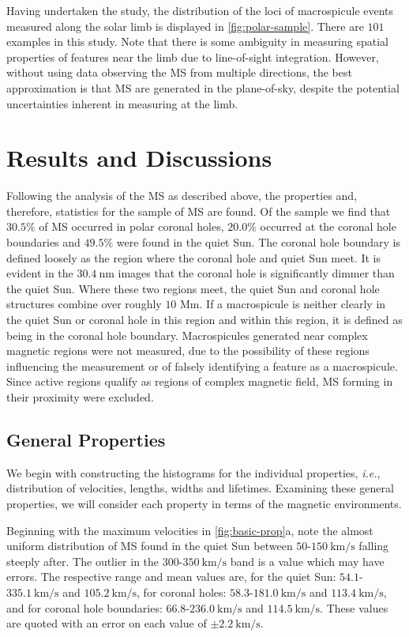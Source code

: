 Having undertaken the study, the distribution of the loci of macrospicule events measured along the solar limb is displayed in \cref{fig:polar-sample}. There are $101$ examples in this study. Note that there is some ambiguity in measuring spatial properties of features near the limb due to line-of-sight integration. However, without using data observing the MS from multiple directions, the best approximation is that MS are generated in the plane-of-sky, despite the potential uncertainties inherent in measuring at the limb.



\section{Results and Discussions}
\label{sec:RandD1}
Following the analysis of the MS as described above, the properties and, therefore, statistics for the sample of MS are found.
Of the sample we find that $30.5 \%$ of MS occurred in polar coronal holes, $20.0 \%$ occurred at the coronal hole boundaries and $49.5 \%$ were found in the quiet Sun.
The coronal hole boundary is defined loosely as the region where the coronal hole and quiet Sun meet. It is evident in the $30.4\ \textrm{nm}$ images that the coronal hole is significantly dimmer than the quiet Sun. 
Where these two regions meet, the quiet Sun and coronal hole structures combine over roughly $10$ Mm.
If a macrospicule is neither clearly in the quiet Sun or coronal hole in this region and within this region, it is defined as being in the coronal hole boundary.
Macrospicules generated near complex magnetic regions were not measured, due to the possibility of these regions influencing the measurement or of falsely identifying a feature as a macrospicule. Since active regions qualify as regions of complex magnetic field, MS forming in their proximity were excluded.


\subsection{General Properties}
We begin with constructing the histograms for the individual properties, \emph{i.e.}, distribution of velocities, lengths, widths and lifetimes. Examining these general properties, we will consider each property in terms of the magnetic environments.

Beginning with the maximum velocities in \cref{fig:basic-prop}a, note the almost uniform distribution of MS found in the quiet Sun between $50$-$150\ \textrm{km/s}$ falling steeply after. The outlier in the $300$-$350\ \textrm{km/s}$ band is a value which may have errors. The respective range and mean values are, for the quiet Sun: $54.1$-$335.1\ \textrm{km/s}$ and $105.2\ \textrm{km/s}$, for coronal holes: $58.3$-$181.0\ \textrm{km/s}$ and $113.4\ \textrm{km/s}$, and for coronal hole boundaries: $66.8$-$236.0\ \textrm{km/s}$ and $114.5\ \textrm{km/s}$. These values are quoted with an error on each value of $\pm2.2\ \textrm{km/s}$.


